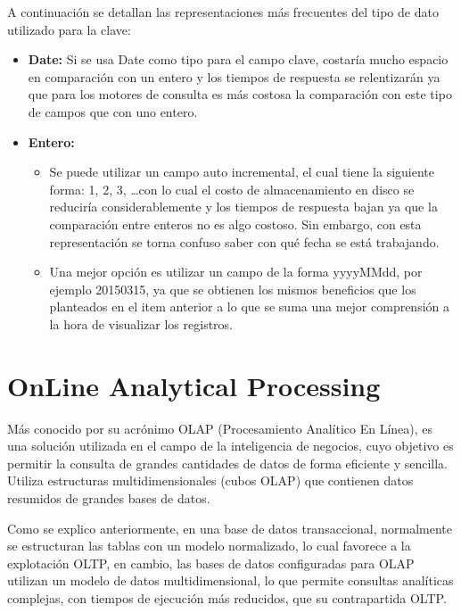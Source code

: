 \documentclass[a4paper,11pt]{article}
\begin{document}
    A continuación se detallan las representaciones más frecuentes del tipo de dato utilizado para la clave:
    
    \begin{itemize}
      \item \textbf{Date:} Si se usa Date como tipo para  el campo clave, costaría mucho espacio en comparación con un entero y los tiempos de respuesta se
      relentizarán ya que para los motores de consulta es más costosa la comparación con este tipo de campos que con uno entero.
      \item \textbf{Entero:}
      \begin{itemize}
        \item Se puede utilizar un campo auto incremental, el cual tiene la siguiente forma: 1, 2, 3, \dots con lo cual el costo de almacenamiento en disco
        se reduciría considerablemente y los tiempos de respuesta bajan ya que la comparación entre enteros no es algo costoso. Sin embargo, con esta representación se
        torna confuso saber con qué fecha se está trabajando.
        \item Una mejor opción es utilizar un campo de la forma yyyyMMdd, por ejemplo 20150315, ya que se obtienen los mismos beneficios que los planteados
        en el item anterior a lo que se suma una mejor comprensión a la hora de visualizar los registros.
      \end{itemize}
    \end{itemize}
    
    
    \section{OnLine Analytical Processing} \label{OLAP}
    
    Más conocido por su acrónimo OLAP (Procesamiento Analítico En Línea), es una solución utilizada en el campo de la inteligencia de negocios, cuyo 
    objetivo es permitir la consulta de grandes cantidades de datos de forma eficiente y sencilla. Utiliza estructuras multidimensionales (cubos OLAP) que 
    contienen datos resumidos de grandes bases de datos.
    
    Como se explico anteriormente, en una base de datos transaccional, normalmente se estructuran las tablas con un modelo normalizado, lo cual favorece a
    la explotación OLTP, en cambio, las bases de datos configuradas para OLAP utilizan un modelo de datos multidimensional, lo que permite consultas 
    analíticas complejas, con tiempos de ejecución más reducidos, que su contrapartida OLTP.
\end{document}
